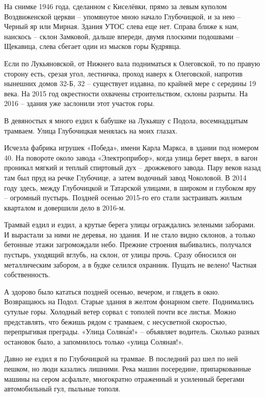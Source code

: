 На снимке 1946 года, сделанном с Киселёвки, прямо за левым куполом Воздвиженской церкви – упомянутое мною начало Глубочицкой, и за нею – Черный яр или Мирная. Здания УТОС слева еще нет. Справа ближе к нам, наискось – склон Замковой, дальше впереди, двумя плоскими подошвами – Щекавица, слева сбегает один из мысков горы Кудрявца.

Если по Лукьяновской, от Нижнего вала подниматься к Олеговской, то по правую сторону есть, срезая угол, лестничка, проход наверх к Олеговской, напротив нынешних домов 32-Б, 32 – существует издавна, по крайней мере с середины 19 века. На 2015 год окрестности охвачены строительством, склоны разрыты. На 2016 – здания уже заслонили этот участок горы.

В девяностых я много ездил к бабушке на Лукьяшу с Подола, восемнадцатым трамваем. Улица Глубочицкая менялась на моих глазах.

Исчезла фабрика игрушек «Победа», имени Карла Маркса, в здании под номером 40. На повороте около завода «Электроприбор», когда улица берет вверх, в вагон проникал мягкий и теплый спиртовый дух – дрожжевого завода. Пару веков назад там был пруд на речке Глубочице, а затем водочный завод Чоколовой. В 2014 году здесь, между Глубочицкой и Татарской улицами, в широком и глубоком яру – огромный пустырь. Поздней осенью 2015-го его стали застраивать жилым кварталом и довершили дело в 2016-м.

Трамвай ездил и ездил, а крутые берега улицы ограждались зелеными заборами. И вырастали за ними не деревья, но здания. И не стало видно склонов, а только бетонные этажи загромождали небо. Прежние строения выбивались, получался пустырь, уходящий вглубь, на склон, от улицы прочь. Сразу обносился он металлическим забором, а в будке селился охранник. Пущать не велено! Частная собственность.

А здорово было кататься поздней осенью, вечером, и глядеть в окно. Возвращаюсь на Подол. Старые здания в желтом фонарном свете. Поднимались сутулые горы. Холодный ветер сорвал с тополей почти все листья. Можно представлять, что бежишь рядом с трамваем, с несусветной скоростью, перепрыгивая преграды. «Улица Солян\'ая!» – объявляет водитель. Сколько разных остановок было, а запомнилось только «улица Соляная!».


Давно не ездил я по Глубочицкой на трамвае. В последний раз шел по ней пешком, но люди казались лишними. Река машин посередине, припаркованные машины на сером асфальте, многократно отраженный и усиленный берегами автомобильный гул, пыльные тополя.

